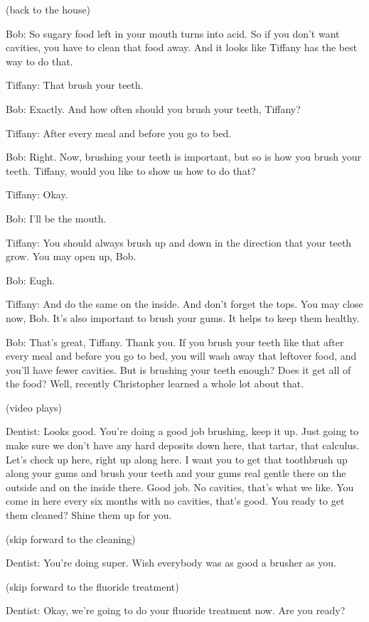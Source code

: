 (back to the house)

Bob: So sugary food left in your mouth turns into acid. So if you don't want cavities, you have to clean that food away. And it looks like Tiffany has the best way to do that.

Tiffany: That brush your teeth.

Bob: Exactly. And how often should you brush your teeth, Tiffany?

Tiffany: After every meal and before you go to bed.

Bob: Right. Now, brushing your teeth is important, but so is how you brush your teeth. Tiffany, would you like to show us how to do that?

Tiffany: Okay.

Bob: I'll be the mouth.

Tiffany: You should always brush up and down in the direction that your teeth grow. You may open up, Bob.

Bob: Eugh.

Tiffany: And do the same on the inside. And don't forget the tops. You may close now, Bob. It's also important to brush your gums. It helps to keep them healthy.

Bob: That's great, Tiffany. Thank you. If you brush your teeth like that after every meal and before you go to bed, you will wash away that leftover food, and you'll have fewer cavities. But is brushing your teeth enough? Does it get all of the food? Well, recently Christopher learned a whole lot about that.

(video plays)

Dentist: Looks good. You're doing a good job brushing, keep it up. Just going to make sure we don't have any hard deposits down here, that tartar, that calculus. Let's check up here, right up along here. I want you to get that toothbrush up along your gums and brush your teeth and your gums real gentle there on the outside and on the inside there. Good job. No cavities, that's what we like. You come in here every six months with no cavities, that's good. You ready to get them cleaned? Shine them up for you.

(skip forward to the cleaning)

Dentist: You're doing super. Wish everybody was as good a brusher as you.

(skip forward to the fluoride treatment)

Dentist: Okay, we're going to do your fluoride treatment now. Are you ready?

